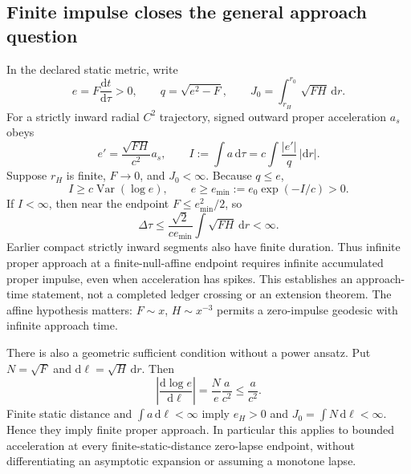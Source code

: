 \documentclass[10pt,twocolumn,letterpaper]{article}
\newcommand{\dd}{\mathrm{d}}
\newcommand{\Var}{\operatorname{Var}}
\begin{document}
\subsection{Finite impulse closes the general approach question}
In the declared static metric, write
\begin{equation}
 e=F\frac{\dd t}{\dd\tau}>0,\qquad q=\sqrt{e^2-F},\qquad
 J_0=\int_{r_H}^{r_0}\sqrt{FH}\,\dd r .
\end{equation}
For a strictly inward radial $C^2$ trajectory, signed outward proper
acceleration $a_s$ obeys
\begin{equation}
 e'=\frac{\sqrt{FH}}{c^2}a_s,\qquad
 I:=\int a\,\dd\tau=c\int\frac{|e'|}{q}\,|\dd r| .
\end{equation}
Suppose $r_H$ is finite, $F\to0$, and $J_0<\infty$.
Because $q\le e$,
\begin{equation}
 I\ge c\Var(\log e),\qquad
 e\ge e_{\min}:=e_0\exp(-I/c)>0 .
\end{equation}
If $I<\infty$, then near the endpoint $F\le e_{\min}^2/2$, so
\begin{equation}
 \Delta\tau\le\frac{\sqrt2}{ce_{\min}}
          \int\sqrt{FH}\,\dd r<\infty .
\end{equation}
Earlier compact strictly inward segments also have finite duration. Thus
infinite proper approach at a finite-null-affine endpoint requires
infinite accumulated proper impulse, even when acceleration has spikes.
This establishes an approach-time statement, not a completed ledger crossing
or an extension theorem. The affine hypothesis matters: $F\sim x$,
$H\sim x^{-3}$ permits a zero-impulse geodesic with infinite approach time.

There is also a geometric sufficient condition without a power ansatz.
Put $N=\sqrt F$ and $\dd\ell=\sqrt H\,\dd r$. Then
\begin{equation}
 \left|\frac{\dd\log e}{\dd\ell}\right|
   =\frac{N}{e}\frac a{c^2}\le\frac a{c^2}.
\end{equation}
Finite static distance and $\int a\,\dd\ell<\infty$ imply $e_H>0$ and
$J_0=\int N\,\dd\ell<\infty$. Hence they imply finite proper approach.
In particular this applies to bounded acceleration at every
finite-static-distance zero-lapse endpoint, without differentiating an
asymptotic expansion or assuming a monotone lapse.
\end{document}
